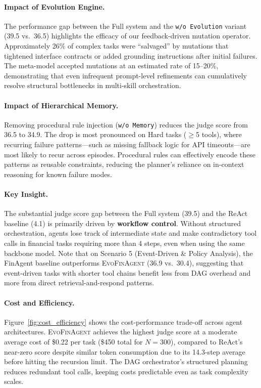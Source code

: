 \documentclass{article}
\begin{document}
\paragraph{Impact of Evolution Engine.}
The performance gap between the Full system and the \texttt{w/o Evolution} variant (39.5 vs.\ 36.5) highlights the efficacy of our feedback-driven mutation operator. Approximately 26\% of complex tasks were ``salvaged'' by mutations that tightened interface contracts or added grounding instructions after initial failures. The meta-model accepted mutations at an estimated rate of 15--20\%, demonstrating that even infrequent prompt-level refinements can cumulatively resolve structural bottlenecks in multi-skill orchestration.

\paragraph{Impact of Hierarchical Memory.}
Removing procedural rule injection (\texttt{w/o Memory}) reduces the judge score from 36.5 to 34.9. 
The drop is most pronounced on Hard tasks ($\ge$5 tools), where recurring failure patterns—such as missing fallback logic for API timeouts—are most likely to recur across episodes. 
Procedural rules can effectively encode these patterns as reusable constraints, reducing the planner's reliance on in-context reasoning for known failure modes.

\paragraph{Key Insight.}
The substantial judge score gap between the Full system (39.5) and the ReAct baseline (4.1) is primarily driven by \textbf{workflow control}. Without structured orchestration, agents lose track of intermediate state and make contradictory tool calls in financial tasks requiring more than 4 steps, even when using the same backbone model. Note that on Scenario 5 (Event-Driven \& Policy Analysis), the FinAgent baseline outperforms \textsc{EvoFinAgent} (36.9 vs.\ 30.4), suggesting that event-driven tasks with shorter tool chains benefit less from DAG overhead and more from direct retrieval-and-respond patterns.

\paragraph{Cost and Efficiency.}
Figure~\ref{fig:cost_efficiency} shows the cost-performance trade-off across agent architectures. \textsc{EvoFinAgent} achieves the highest judge score at a moderate average cost of \$0.22 per task (\$450 total for $N=300$), compared to ReAct's near-zero score despite similar token consumption due to its 14.3-step average before hitting the recursion limit. The DAG orchestrator's structured planning reduces redundant tool calls, keeping costs predictable even as task complexity scales.
\end{document}
